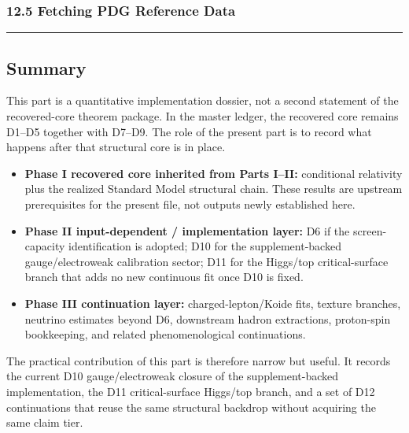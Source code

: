 \subsubsection{12.5 Fetching PDG Reference Data}\label{125-fetching-pdg-reference-data}

\begin{Shaded}
\begin{Highlighting}[]
\end{Highlighting}
\end{Shaded}

\begin{center}\rule{0.5\linewidth}{0.5pt}\end{center}

\subsection{Summary}\label{summary}

This part is a quantitative implementation dossier, not a second statement of the recovered-core theorem package. In the master ledger, the recovered core remains D1--D5 together with D7--D9. The role of the present part is to record what happens after that structural core is in place.

\begin{itemize}
\item \textbf{Phase I recovered core inherited from Parts I--II:} conditional relativity plus the realized Standard Model structural chain. These results are upstream prerequisites for the present file, not outputs newly established here.
\item \textbf{Phase II input-dependent / implementation layer:} D6 if the screen-capacity identification is adopted; D10 for the supplement-backed gauge/electroweak calibration sector; D11 for the Higgs/top critical-surface branch that adds no new continuous fit once D10 is fixed.
\item \textbf{Phase III continuation layer:} charged-lepton/Koide fits, texture branches, neutrino estimates beyond D6, downstream hadron extractions, proton-spin bookkeeping, and related phenomenological continuations.
\end{itemize}

The practical contribution of this part is therefore narrow but useful. It records the current D10 gauge/electroweak closure of the supplement-backed implementation, the D11 critical-surface Higgs/top branch, and a set of D12 continuations that reuse the same structural backdrop without acquiring the same claim tier.

